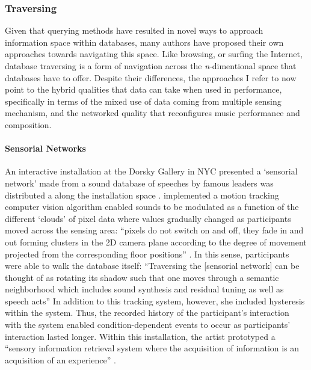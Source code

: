 \subsubsection{Traversing}
{
	Given that querying methods have resulted in novel ways to approach information space within databases, many authors have proposed their own approaches towards navigating this space. Like browsing, or surfing the Internet, database traversing is a form of navigation across the \textit{n}-dimentional space that databases have to offer. Despite their differences, the approaches I refer to now point to the hybrid qualities that data can take when used in performance, specifically in terms of the mixed use of data coming from multiple sensing mechanism, and the networked quality that reconfigures music performance and composition.

	\paragraph{Sensorial Networks}
	An interactive installation at the Dorsky Gallery in NYC presented a `sensorial network' made from a sound database of speeches by famous leaders was distributed a along the installation space \parencite{Cho00:Voi, icmc/bbp2372.2000.146}. \citeauthor{icmc/bbp2372.2000.146} implemented a motion tracking computer vision algorithm enabled sounds to be modulated as a function of the different `clouds' of pixel data where values gradually changed as participants moved across the sensing area: ``pixels do not switch on and off, they fade in and out forming clusters in the 2D camera plane according to the degree of movement projected from the corresponding floor positions'' \parencite[4]{icmc/bbp2372.2000.146}. In this sense, participants were able to walk the database itself: ``Traversing the [sensorial network] can be thought of as rotating its shadow such that one moves through a semantic neighborhood which includes sound synthesis and residual tuning as well as speech acts'' \parencite[3]{icmc/bbp2372.2000.146}	In addition to this tracking system, however, she included hysteresis within the system. Thus, the recorded history of the participant's interaction with the system enabled condition-dependent events to occur as participants' interaction lasted longer. Within this installation, the artist prototyped a ``sensory information retrieval system where the acquisition of information is an acquisition of an experience'' \parencite[1]{icmc/bbp2372.2000.146}.

}
